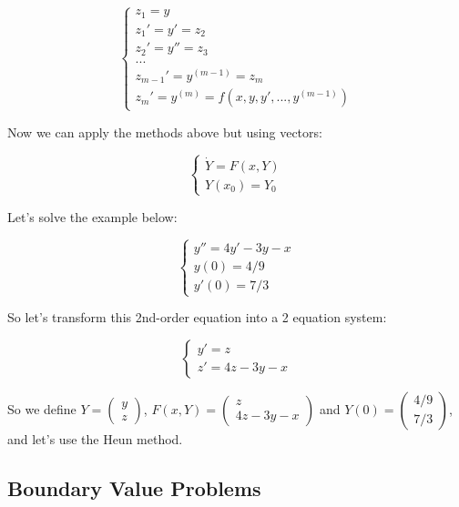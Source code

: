 \documentclass[11pt]{article}
\begin{document}
\[
\begin{cases}
    z_1 = y \\
    z_1' = y' = z_2 \\
    z_2' = y'' = z_3 \\
    ... \\
    z_{m-1}' = y^{(m-1)} = z_m \\
    z_m' = y^{(m)} = f(x,y,y',...,y^{(m-1)})
\end{cases}
\]

Now we can apply the methods above but using vectors:

\[
\begin{cases}
    \dot Y = F(x,Y) \\
    Y(x_0) = Y_0
\end{cases}
\]

    Let's solve the example below:

\[
\begin{cases}
    y'' = 4y'-3y-x \\
    y(0) = 4/9 \\
    y'(0) = 7/3
\end{cases}
\]

So let's transform this 2nd-order equation into a 2 equation system:

\[
\begin{cases}
    y' = z \\
    z' = 4z-3y-x
\end{cases}
\]

So we define \(Y = \begin{pmatrix} y \\ z \end{pmatrix}\),
\(F(x,Y) = \begin{pmatrix} z \\ 4z-3y-x \end{pmatrix}\) and
\(Y(0) = \begin{pmatrix} 4/9 \\ 7/3 \end{pmatrix}\), and let's use the
Heun method.

    \subsection{Boundary Value Problems}\label{boundary-value-problems}


    
    
    
    
\end{document}
